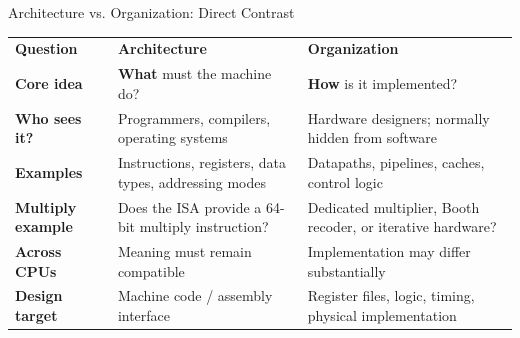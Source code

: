 \documentclass[aspectratio=169,11pt,t]{beamer}
\newcommand{\key}[1]{\textbf{#1}}
\begin{document}
\begin{frame}{Architecture vs. Organization: Direct Contrast}

\small

\begin{center}

\renewcommand{\arraystretch}{1.35}

\begin{tabular}{
  >{\raggedright\arraybackslash}p{2.5cm}
  >{\raggedright\arraybackslash}p{4.45cm}
  >{\raggedright\arraybackslash}p{4.45cm}
}

\rowcolor{navy}
\color{white}\textbf{Question}
&
\color{white}\textbf{Architecture}
&
\color{white}\textbf{Organization}
\\

\rowcolor{lightblue}
\textbf{Core idea}
&
\key{What} must the machine do?
&
\key{How} is it implemented?
\\

\rowcolor{softgray}
\textbf{Who sees it?}
&
Programmers, compilers,
operating systems
&
Hardware designers;
normally hidden from software
\\

\rowcolor{lightblue}
\textbf{Examples}
&
Instructions, registers,
data types, addressing modes
&
Datapaths, pipelines,
caches, control logic
\\

\rowcolor{softgray}
\textbf{Multiply example}
&
Does the ISA provide
a 64-bit multiply instruction?
&
Dedicated multiplier,
Booth recoder,
or iterative hardware?
\\

\rowcolor{lightblue}
\textbf{Across CPUs}
&
Meaning must remain compatible
&
Implementation may differ substantially
\\

\rowcolor{softgray}
\textbf{Design target}
&
Machine code / assembly interface
&
Register files, logic,
timing, physical implementation
\\

\end{tabular}

\end{center}

\end{frame}



\end{document}
